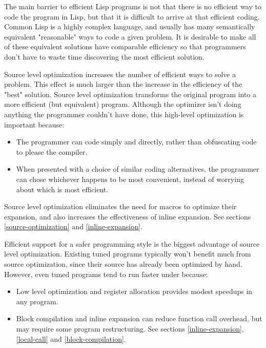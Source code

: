 {The main barrier to efficient Lisp programs is not that there is no efficient
way to code the program in Lisp, but that it is difficult to arrive at that
efficient coding.  Common Lisp is a highly complex language, and usually has
many semantically equivalent "reasonable" ways to code a given problem.  It is
desirable to make all of these equivalent solutions have comparable efficiency
so that programmers don't have to waste time discovering the most efficient
solution.

Source level optimization increases the number of efficient ways to solve a
problem.  This effect is much larger than the increase in the efficiency of the
"best" solution.  Source level optimization transforms the original program
into a more efficient (but equivalent) program.  Although the optimizer isn't
doing anything the programmer couldn't have done, this high-level optimization
is important because:
\begin{itemize}

\item
The programmer can code simply and directly, rather than obfuscating code to
please the compiler.

\item
When presented with a choice of similar coding alternatives, the programmer can
chose whichever happens to be most convenient, instead of worrying about which
is most efficient.
\end{itemize}

Source level optimization eliminates the need for macros to optimize their
expansion, and also increases the effectiveness of inline expansion.
See sections \ref{source-optimization} and \ref{inline-expansion}.

Efficient support for a safer programming style is the biggest advantage of
source level optimization.  Existing tuned programs typically won't benefit
much from source optimization, since their source has already been optimized by
hand.  However, even tuned programs tend to run faster under \python{} because:
\begin{itemize}

\item
Low level optimization and register allocation provides modest speedups in any
program.

\item
Block compilation and inline expansion can reduce function call overhead,
but may require some program restructuring.  See sections
\ref{inline-expansion}, \ref{local-call} and \ref{block-compilation}.


\end{itemize}}
